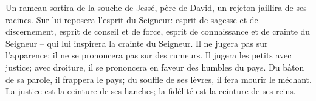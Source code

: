 Un rameau sortira de la souche de Jessé, père de David,
	un rejeton jaillira de ses racines.
Sur lui reposera l’esprit du Seigneur:
	esprit de sagesse et de discernement,
	esprit de conseil et de force,
	esprit de connaissance et de crainte du Seigneur
	– qui lui inspirera la crainte du Seigneur.
Il ne jugera pas sur l’apparence;
	il ne se prononcera pas sur des rumeurs.
Il jugera les petits avec justice;
	avec droiture, il se prononcera en faveur des humbles du pays.
Du bâton de sa parole, il frappera le pays;
	du souffle de ses lèvres, il fera mourir le méchant.
La justice est la ceinture de ses hanches;
	la fidélité est la ceinture de ses reins.
